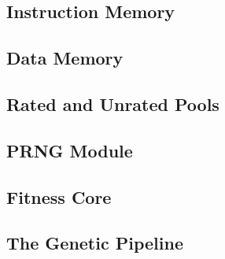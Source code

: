 \subsection{Instruction Memory}
\label{subsec:fpga-instruction-memory}


\subsection{Data Memory}
\label{subsec:fpga-data-memory}


\subsection{Rated and Unrated Pools}


\subsection{PRNG Module}
    
 

\subsection{Fitness Core} \label{fpga:fitness:ss:design_of_the_fitness_core}
     \label{fpga:subsection:fitness_core}


\subsection{The Genetic Pipeline}
\label{fpga:subsection:genetic_pipeline}

